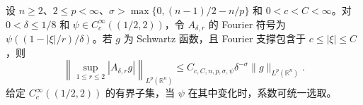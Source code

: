 设 $n\ge2$、$2\le p<\infty$、$\sigma>\max\{0,(n-1)/2-n/p\}$ 和 $0<c<C<\infty$。对 $0<\delta\le1/8$ 和 $\psi\in C_c^\infty((1/2,2))$，令 $A_{\delta,r}$ 的 Fourier 符号为 $\psi((1-|\xi|/r)/\delta)$。若 $g$ 为 Schwartz 函数，且 Fourier 支撑包含于 $c\le|\xi|\le C$，则
\[
\left\|\sup_{1\le r\le2}|A_{\delta,r}g|\right\|_{L^p(\mathbb R^n)}
\le C_{c,C,n,p,\sigma,\psi}\delta^{-\sigma}\|g\|_{L^p(\mathbb R^n)} .
\]
给定 $C_c^\infty((1/2,2))$ 的有界子集，当 $\psi$ 在其中变化时，系数可统一选取。
